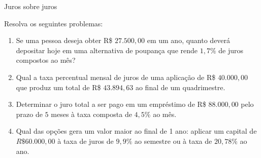\begin{task}{Juros sobre juros}

Resolva os seguintes problemas:

\begin{enumerate}

\item{}
Se uma pessoa deseja obter R\$ $27.500{,}00$ em um ano, quanto deverá depositar hoje em uma alternativa de poupança que rende $1{,}7\%$ de juros compostos ao mês?

\item{}
Qual a taxa percentual mensal de juros de uma aplicação de R\$ $40.000{,}00$ que produz um total de R\$ $43.894{,}63$ ao final de um quadrimestre.

\item{}
Determinar o juro total a ser pago em um empréstimo de R\$ $88.000{,}00$ pelo prazo de $5$ meses à taxa composta de $4{,}5\%$ ao mês.

\item{}
Qual das opções gera um valor maior ao final de 1 ano: aplicar um capital de $R\$60.000{,}00$ à taxa de juros de $9{,}9\%$ ao semestre ou à taxa de $20{,}78\%$ ao ano.

\end{enumerate}

\end{task}

